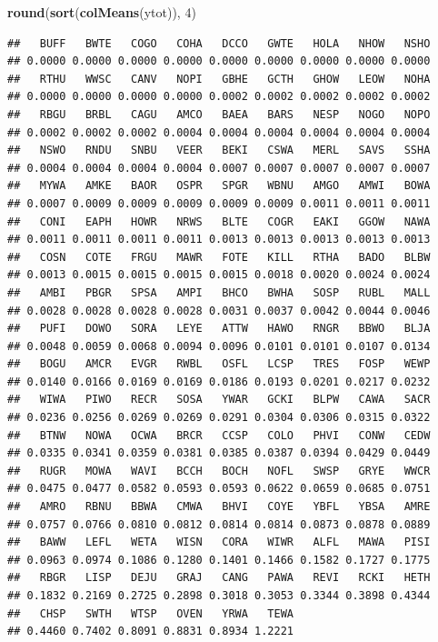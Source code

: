 \documentclass[12pt,]{book}
\newenvironment{Shaded}{\begin{snugshade}}{\end{snugshade}}
\newcommand{\DecValTok}[1]{\textcolor[rgb]{0.00,0.00,0.81}{#1}}
\newcommand{\KeywordTok}[1]{\textcolor[rgb]{0.13,0.29,0.53}{\textbf{#1}}}
\newcommand{\NormalTok}[1]{#1}
\begin{document}
\begin{Shaded}
\begin{Highlighting}[]
\KeywordTok{round}\NormalTok{(}\KeywordTok{sort}\NormalTok{(}\KeywordTok{colMeans}\NormalTok{(ytot)), }\DecValTok{4}\NormalTok{)}
\end{Highlighting}
\end{Shaded}

\begin{verbatim}
##   BUFF   BWTE   COGO   COHA   DCCO   GWTE   HOLA   NHOW   NSHO 
## 0.0000 0.0000 0.0000 0.0000 0.0000 0.0000 0.0000 0.0000 0.0000 
##   RTHU   WWSC   CANV   NOPI   GBHE   GCTH   GHOW   LEOW   NOHA 
## 0.0000 0.0000 0.0000 0.0000 0.0002 0.0002 0.0002 0.0002 0.0002 
##   RBGU   BRBL   CAGU   AMCO   BAEA   BARS   NESP   NOGO   NOPO 
## 0.0002 0.0002 0.0002 0.0004 0.0004 0.0004 0.0004 0.0004 0.0004 
##   NSWO   RNDU   SNBU   VEER   BEKI   CSWA   MERL   SAVS   SSHA 
## 0.0004 0.0004 0.0004 0.0004 0.0007 0.0007 0.0007 0.0007 0.0007 
##   MYWA   AMKE   BAOR   OSPR   SPGR   WBNU   AMGO   AMWI   BOWA 
## 0.0007 0.0009 0.0009 0.0009 0.0009 0.0009 0.0011 0.0011 0.0011 
##   CONI   EAPH   HOWR   NRWS   BLTE   COGR   EAKI   GGOW   NAWA 
## 0.0011 0.0011 0.0011 0.0011 0.0013 0.0013 0.0013 0.0013 0.0013 
##   COSN   COTE   FRGU   MAWR   FOTE   KILL   RTHA   BADO   BLBW 
## 0.0013 0.0015 0.0015 0.0015 0.0015 0.0018 0.0020 0.0024 0.0024 
##   AMBI   PBGR   SPSA   AMPI   BHCO   BWHA   SOSP   RUBL   MALL 
## 0.0028 0.0028 0.0028 0.0028 0.0031 0.0037 0.0042 0.0044 0.0046 
##   PUFI   DOWO   SORA   LEYE   ATTW   HAWO   RNGR   BBWO   BLJA 
## 0.0048 0.0059 0.0068 0.0094 0.0096 0.0101 0.0101 0.0107 0.0134 
##   BOGU   AMCR   EVGR   RWBL   OSFL   LCSP   TRES   FOSP   WEWP 
## 0.0140 0.0166 0.0169 0.0169 0.0186 0.0193 0.0201 0.0217 0.0232 
##   WIWA   PIWO   RECR   SOSA   YWAR   GCKI   BLPW   CAWA   SACR 
## 0.0236 0.0256 0.0269 0.0269 0.0291 0.0304 0.0306 0.0315 0.0322 
##   BTNW   NOWA   OCWA   BRCR   CCSP   COLO   PHVI   CONW   CEDW 
## 0.0335 0.0341 0.0359 0.0381 0.0385 0.0387 0.0394 0.0429 0.0449 
##   RUGR   MOWA   WAVI   BCCH   BOCH   NOFL   SWSP   GRYE   WWCR 
## 0.0475 0.0477 0.0582 0.0593 0.0593 0.0622 0.0659 0.0685 0.0751 
##   AMRO   RBNU   BBWA   CMWA   BHVI   COYE   YBFL   YBSA   AMRE 
## 0.0757 0.0766 0.0810 0.0812 0.0814 0.0814 0.0873 0.0878 0.0889 
##   BAWW   LEFL   WETA   WISN   CORA   WIWR   ALFL   MAWA   PISI 
## 0.0963 0.0974 0.1086 0.1280 0.1401 0.1466 0.1582 0.1727 0.1775 
##   RBGR   LISP   DEJU   GRAJ   CANG   PAWA   REVI   RCKI   HETH 
## 0.1832 0.2169 0.2725 0.2898 0.3018 0.3053 0.3344 0.3898 0.4344 
##   CHSP   SWTH   WTSP   OVEN   YRWA   TEWA 
## 0.4460 0.7402 0.8091 0.8831 0.8934 1.2221
\end{verbatim}
\end{document}
